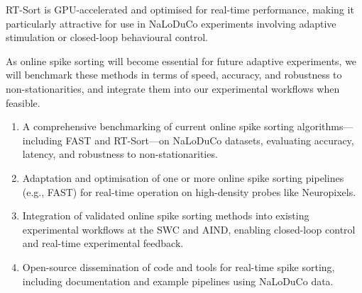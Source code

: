 RT-Sort is GPU-accelerated and optimised for real-time performance, making it particularly attractive for use in NaLoDuCo experiments involving adaptive stimulation or closed-loop behavioural control.

As online spike sorting will become essential for future adaptive experiments, we will benchmark these methods in terms of speed, accuracy, and robustness to non-stationarities, and integrate them into our experimental workflows when feasible.


\begin{enumerate}
    \item A comprehensive benchmarking of current online spike sorting algorithms—including FAST and RT-Sort—on NaLoDuCo datasets, evaluating accuracy, latency, and robustness to non-stationarities.
    
    \item Adaptation and optimisation of one or more online spike sorting pipelines (e.g., FAST) for real-time operation on high-density probes like Neuropixels.

    \item Integration of validated online spike sorting methods into existing experimental workflows at the SWC and AIND, enabling closed-loop control and real-time experimental feedback.

    \item Open-source dissemination of code and tools for real-time spike sorting, including documentation and example pipelines using NaLoDuCo data.
\end{enumerate}

